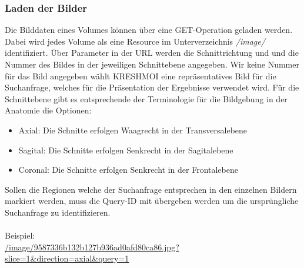 \subsubsection{Laden der Bilder}
\label{sec:Laden der Bilder}
Die Bilddaten eines Volumes können über eine GET-Operation geladen werden.
Dabei wird jedes Volume als eine Resource im Unterverzeichnis \textit{/image/} identifiziert.
Über Parameter in der URL werden die Schnittrichtung und und die Nummer des Bildes in der jeweiligen Schnittebene angegeben.
Wir keine Nummer für das Bild angegeben wählt KRESHMOI eine repräsentatives Bild für die Suchanfrage, welches für die Präsentation der Ergebnisse verwendet wird.
Für die Schnittebene gibt es entsprechende der Terminologie für die Bildgebung in der Anatomie die Optionen:
\begin{itemize}
	\item Axial: Die Schnitte erfolgen Waagrecht in der Transversalebene
	\item Sagital: Die Schnitte erfolgen Senkrecht in der Sagitalebene
	\item Coronal: Die Schnitte erfolgen Senkrecht in der Frontalebene 
\end{itemize}
Sollen die Regionen welche der Suchanfrage entsprechen in den einzelnen Bildern markiert werden, muss die Query-ID mit übergeben werden um die ursprüngliche Suchanfrage zu identifizieren.
\\
\\
Beispiel:
\\
\url{/image/9587336b132b127b936ad0afd80ca86.jpg?slice=1&direction=axial&query=1}
